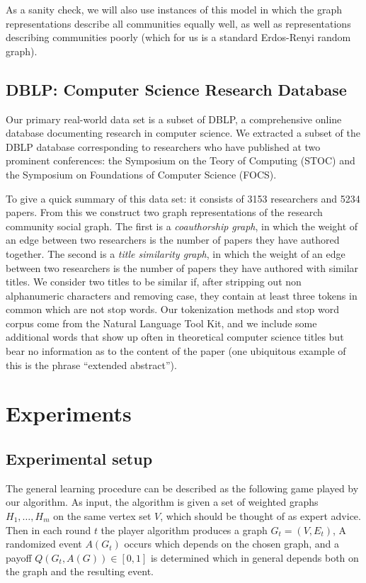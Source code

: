 \documentclass{article}[11pt]
\begin{document}
As a sanity check, we will also use instances of this model in which the graph
representations describe all communities equally well, as well as
representations describing communities poorly (which for us is a standard
Erdos-Renyi random graph).


\subsection{DBLP: Computer Science Research Database}
Our primary real-world data set is a subset of DBLP, a comprehensive online
database documenting research in computer science. We extracted a subset of the
DBLP database corresponding to researchers who have published at two prominent
conferences: the Symposium on the Teory of Computing (STOC) and the Symposium
on Foundations of Computer Science (FOCS). 

To give a quick summary of this data set: it consists of 3153 researchers and
5234 papers. From this we construct two graph representations of the research
community social graph. The first is a \emph{coauthorship graph}, in which the
weight of an edge between two researchers is the number of papers they have
authored together. The second is a \emph{title similarity graph}, in which the
weight of an edge between two researchers is the number of papers they have
authored with similar titles. We consider two titles to be similar if, after
stripping out non alphanumeric characters and removing case, they contain at
least three tokens in common which are not stop words. Our tokenization methods
and stop word corpus come from the Natural Language Tool Kit, and we include some
additional words that show up often in theoretical computer science titles but
bear no information as to the content of the paper (one ubiquitous example of
this is the phrase ``extended abstract'').

\section{Experiments}

\subsection{Experimental setup}
The general learning procedure can be described as the following game played by
our algorithm. As input, the algorithm is given a set of weighted graphs $H_1,
\dots, H_m$ on the same vertex set $V$, which should be thought of as expert
advice. Then in each round $t$ the player algorithm produces a graph $G_t =
(V, E_t)$, A randomized event $A(G_t)$ occurs which depends on the chosen
graph, and a payoff $Q(G_t, A(G)) \in [0,1]$ is determined which in general
depends both on the graph and the resulting event.
\end{document}

